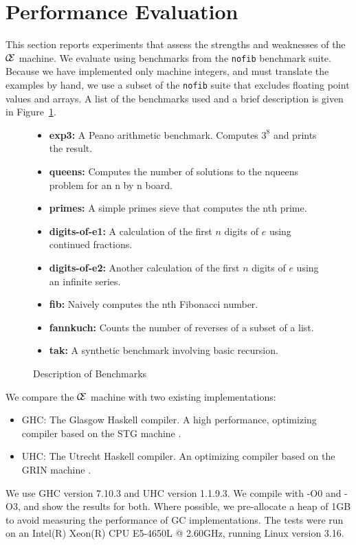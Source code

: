 \section{Performance Evaluation} \label{sec:eval}

This section reports experiments that assess the strengths and weaknesses of
the $\mathcal{\mathcal{C} \mskip -4mu \mathcal{E}}$ machine. We evaluate using benchmarks from the \texttt{nofib}
benchmark suite. Because we have implemented only machine integers, and must
translate the examples by hand, we use a subset of the \texttt{nofib} suite that
excludes floating point values and arrays. A list of the benchmarks used and a
brief description is given in Figure~\ref{fig:bench}.

\begin{figure}
\begin{itemize}
\item \textbf{exp3:} A Peano arithmetic benchmark. Computes $3^8$ and prints the result. 
\item \textbf{queens:} Computes the number of solutions to the nqueens problem
for an n by n board.
\item \textbf{primes:} A simple primes sieve that computes the nth prime.
\item \textbf{digits-of-e1:} A calculation of the first $n$ digits of $e$ using
continued fractions. 
\item \textbf{digits-of-e2:} Another calculation of the first $n$ digits of $e$ using an
infinite series.  
\item \textbf{fib:} Naively computes the nth Fibonacci number.
\item \textbf{fannkuch:} Counts the number of reverses of a subset of a list.
\item \textbf{tak:} A synthetic benchmark involving basic recursion.
\end{itemize}
\caption{Description of Benchmarks}
\label{fig:bench}
\end{figure}

We compare the $\mathcal{\mathcal{C} \mskip -4mu \mathcal{E}}$ machine with two existing implementations:

\begin{itemize}
\item GHC: The Glasgow Haskell compiler. A high performance, optimizing compiler
based on the STG machine \cite{jonesstg}.
\item UHC: The Utrecht Haskell compiler. An optimizing compiler based on the
GRIN machine \cite{boquist1997grin,dijkstra2009architecture}.
\end{itemize}

We use GHC version 7.10.3 and UHC version 1.1.9.3. We compile with -O0 and -O3,
and show the results for both. Where possible, we pre-allocate a heap of 1GB 
to avoid measuring the performance of GC implementations. The tests were run on
an Intel(R) Xeon(R) CPU E5-4650L @ 2.60GHz, running Linux version 3.16. 
